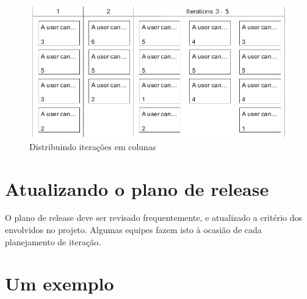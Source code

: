 \documentclass[a4paper,abntfigtabnum,noindentfirst]{abnt}
\begin{document}
\begin{figure}
	\caption{Distribuindo iterações em colunas}
	\label{iteracoes-em-colunas}
	\begin{center}
	\includegraphics[scale=0.6]{iteracoes-em-colunas}
	\end{center}
\end{figure}


\section{Atualizando o plano de release}

O plano de release deve ser revisado frequentemente, e atualizado a critério dos envolvidos no projeto. Algumas equipes fazem isto à ocasião de cada planejamento de iteração.


\section{Um exemplo}
\end{document}
